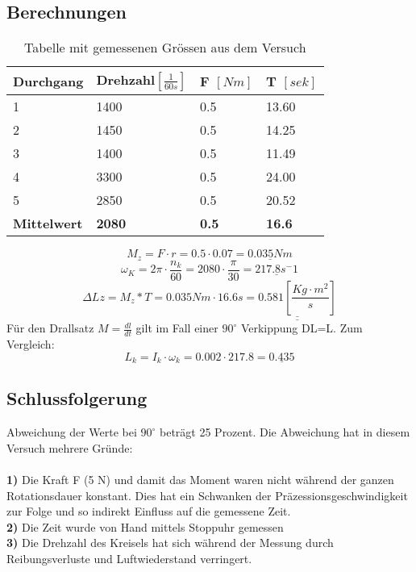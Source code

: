 \documentclass{article}
\begin{document}
\subsection{Berechnungen}
\begin{table}[H]
   \center
    \begin{tabular}{|l|l|l|l|}
        \hline
           Durchgang & Drehzahl$[\frac{1}{60s}]$ & F $[Nm]$&T $[sek]$     \\ \hline
        1         & 1400    & 0.5 & 13.60  \\ 
        2         & 1450    & 0.5 & 14.25  \\ 
        3         & 1400    & 0.5 & 11.49\\ 
        4         & 3300     & 0.5 & 24.00 \\ 
        5         & 2850     & 0.5 & 20.52 \\
        \hline
        \textbf{Mittelwert}&\textbf{2080}&\textbf{0.5}&\textbf{16.6}\\ \hline
    \end{tabular}
    \caption{Tabelle mit gemessenen Grössen aus dem Versuch}
\end{table}
\begin{equation}
M_z=F \cdot r = 0.5 \cdot 0.07 = \underline{0.035Nm}
\end{equation}
\begin{equation}
\omega_K= 2\pi \cdot\frac{n_k}{60} = 2080 \cdot \frac{\pi}{30} = \underline{217.8s^-1}
\end{equation}
\begin{equation}
\Delta Lz=M_z*T=0.035Nm \cdot 16.6s = \underline{\underline{0.581 [\frac{Kg\cdot m^2}{s}]}} 
\end{equation}
Für den Drallsatz $M = \frac{dl}{dt}$ gilt im Fall einer $90^\circ$ Verkippung DL=L.
Zum Vergleich:
\begin{equation}
L_k = I_k \cdot\omega_k = 0.002 \cdot  217.8 = \underline{0.435}
\end{equation}



\subsection{Schlussfolgerung}
Abweichung der Werte bei $90^\circ$ beträgt 25 Prozent.
Die Abweichung hat in diesem Versuch mehrere Gründe:\\\\
\textbf{1)} Die Kraft F (5 N) und damit das Moment waren nicht während der ganzen Rotationsdauer
konstant. Dies hat ein Schwanken der Präzessionsgeschwindigkeit zur Folge und so indirekt
Einfluss auf die gemessene Zeit.\\
\textbf{2)} Die Zeit wurde von Hand mittels Stoppuhr gemessen\\
\textbf{3)} Die Drehzahl des Kreisels hat sich während der Messung durch Reibungsverluste und Luftwiederstand
verringert.
\newpage
\end{document}
